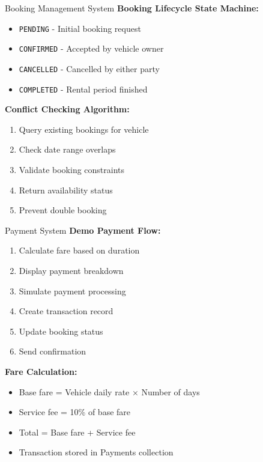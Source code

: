 \documentclass{beamer}
\begin{document}
\begin{frame}{Booking Management System}
\textbf{Booking Lifecycle State Machine:}
\begin{itemize}
    \item \texttt{PENDING} - Initial booking request
    \item \texttt{CONFIRMED} - Accepted by vehicle owner
    \item \texttt{CANCELLED} - Cancelled by either party
    \item \texttt{COMPLETED} - Rental period finished
\end{itemize}

\vspace{0.3cm}
\textbf{Conflict Checking Algorithm:}
\begin{enumerate}
    \item Query existing bookings for vehicle
    \item Check date range overlaps
    \item Validate booking constraints
    \item Return availability status
    \item Prevent double booking
\end{enumerate}
\end{frame}

\begin{frame}{Payment System}
\textbf{Demo Payment Flow:}
\begin{enumerate}
    \item Calculate fare based on duration
    \item Display payment breakdown
    \item Simulate payment processing
    \item Create transaction record
    \item Update booking status
    \item Send confirmation
\end{enumerate}

\vspace{0.3cm}
\textbf{Fare Calculation:}
\begin{itemize}
    \item Base fare = Vehicle daily rate × Number of days
    \item Service fee = 10\% of base fare
    \item Total = Base fare + Service fee
    \item Transaction stored in Payments collection
\end{itemize}
\end{frame}
\end{document}
